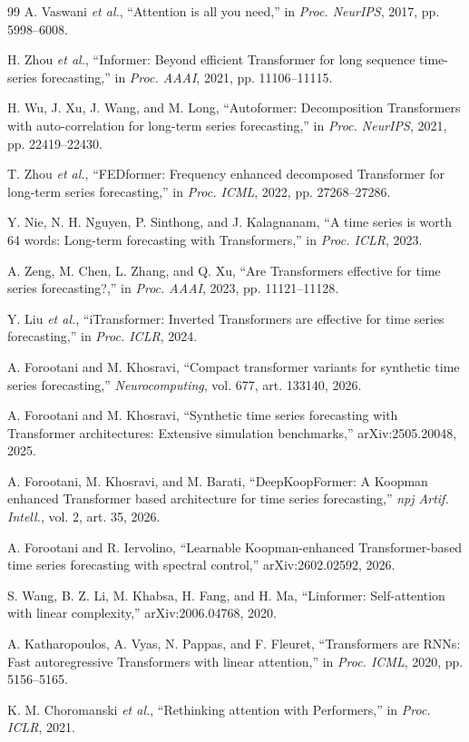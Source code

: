 \documentclass[journal]{IEEEtran}
\begin{document}
\begin{thebibliography}{99}
A. Vaswani \emph{et al.}, ``Attention is all you need,'' in \emph{Proc. NeurIPS}, 2017, pp. 5998--6008.

H. Zhou \emph{et al.}, ``Informer: Beyond efficient Transformer for long sequence time-series forecasting,'' in \emph{Proc. AAAI}, 2021, pp. 11106--11115.

H. Wu, J. Xu, J. Wang, and M. Long, ``Autoformer: Decomposition Transformers with auto-correlation for long-term series forecasting,'' in \emph{Proc. NeurIPS}, 2021, pp. 22419--22430.

T. Zhou \emph{et al.}, ``FEDformer: Frequency enhanced decomposed Transformer for long-term series forecasting,'' in \emph{Proc. ICML}, 2022, pp. 27268--27286.

Y. Nie, N. H. Nguyen, P. Sinthong, and J. Kalagnanam, ``A time series is worth 64 words: Long-term forecasting with Transformers,'' in \emph{Proc. ICLR}, 2023.

A. Zeng, M. Chen, L. Zhang, and Q. Xu, ``Are Transformers effective for time series forecasting?,'' in \emph{Proc. AAAI}, 2023, pp. 11121--11128.

Y. Liu \emph{et al.}, ``iTransformer: Inverted Transformers are effective for time series forecasting,'' in \emph{Proc. ICLR}, 2024.

A. Forootani and M. Khosravi, ``Compact transformer variants for synthetic time series forecasting,'' \emph{Neurocomputing}, vol. 677, art. 133140, 2026.

A. Forootani and M. Khosravi, ``Synthetic time series forecasting with Transformer architectures: Extensive simulation benchmarks,'' arXiv:2505.20048, 2025.

A. Forootani, M. Khosravi, and M. Barati, ``DeepKoopFormer: A Koopman enhanced Transformer based architecture for time series forecasting,'' \emph{npj Artif. Intell.}, vol. 2, art. 35, 2026.

A. Forootani and R. Iervolino, ``Learnable Koopman-enhanced Transformer-based time series forecasting with spectral control,'' arXiv:2602.02592, 2026.

S. Wang, B. Z. Li, M. Khabsa, H. Fang, and H. Ma, ``Linformer: Self-attention with linear complexity,'' arXiv:2006.04768, 2020.

A. Katharopoulos, A. Vyas, N. Pappas, and F. Fleuret, ``Transformers are RNNs: Fast autoregressive Transformers with linear attention,'' in \emph{Proc. ICML}, 2020, pp. 5156--5165.

K. M. Choromanski \emph{et al.}, ``Rethinking attention with Performers,'' in \emph{Proc. ICLR}, 2021.

\end{thebibliography}
\end{document}
